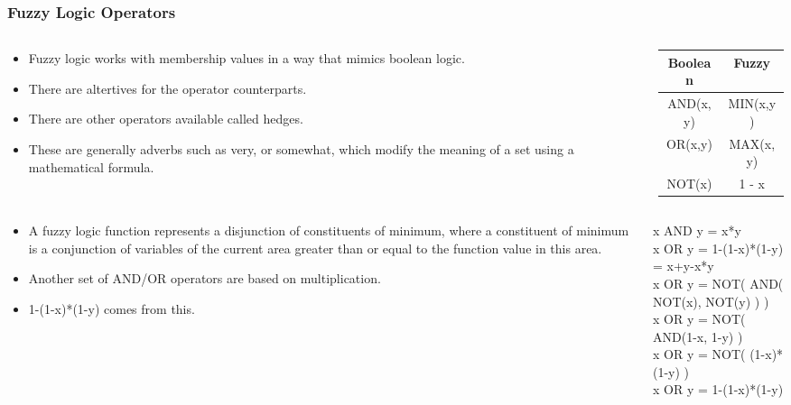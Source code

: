 \documentclass{beamer}
\begin{document}
   \begin{frame}
      \frametitle{Fuzzy Logic Operators}
      \begin{columns}[T]
        \begin{column}[T]{5cm}
            \begin{itemize}
               \item Fuzzy logic works with membership values in a way that mimics boolean logic.
               \item There are altertives for the operator counterparts.
               \item There are other operators available called hedges.
               \item These are generally adverbs such as very, or somewhat, which modify the meaning of a set using a mathematical formula.
            \end{itemize}
        \end{column}
        \begin{column}[T]{5cm}
            \begin{tabular}{| c | c |}
               \hline
               Boolean & Fuzzy \\
               \hline
               AND(x,y) & MIN(x,y) \\
               OR(x,y)  & MAX(x,y) \\
               NOT(x) & 1 - x \\
               \hline
            \end{tabular}
        \end{column}
      \end{columns}
   \end{frame}

   \begin{frame}
      \begin{columns}[T]
         \begin{column}[T]{5cm}
            \begin{itemize}
               \item A fuzzy logic function represents a disjunction of constituents of minimum, where a constituent of minimum is a conjunction of variables of the current area greater than or equal to the function value in this area.
               \item Another set of AND/OR operators are based on multiplication.
               \item 1-(1-x)*(1-y) comes from this.
            \end{itemize}
         \end{column}
         \begin{column}[T]{5cm}
            x AND y = x*y \\
            x OR y = 1-(1-x)*(1-y) = x+y-x*y \\
            x OR y = NOT( AND( NOT(x), NOT(y) ) ) \\
            x OR y = NOT( AND(1-x, 1-y) ) \\
            x OR y = NOT( (1-x)*(1-y) ) \\
            x OR y = 1-(1-x)*(1-y)
         \end{column}
      \end{columns}
   \end{frame}
\end{document}
